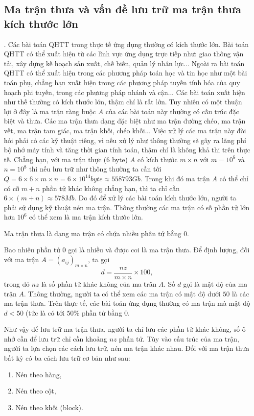 \subsection{Ma trận thưa và vấn đề lưu trữ ma trận thưa kích thước lớn}.
Các bài toán QHTT trong thực tế ứng dụng thường có kích thước lớn. Bài toán QHTT có thể xuất hiện từ các lĩnh vực ứng dụng trực tiếp như: giao thông vận tải, xây dựng kế hoạch sản xuất, chế biến, quản lý nhân lực... Ngoài ra bài toán QHTT có thể xuất hiện trong các phương pháp toán học và tin học như một bài toán phụ, chẳng hạn xuất hiện trong các phương pháp tuyến tính hóa của quy hoạch phi tuyến, trong các phương pháp nhánh và cận... Các bài toán xuất hiện như thế thường có kích thước lớn, thậm chí là rất lớn. Tuy nhiên có một thuận lợi ở đây là ma trận ràng buộc $A$ của các bài toán này thường có cấu trúc đặc biệt và thưa. Các ma trận thưa dạng đặc biệt như ma trận đường chéo, ma trận vết, ma trận tam giác, ma trận khối, chéo khối... Việc xử lý các ma trận này đòi hỏi phải có các kỹ thuật riêng, vì nếu xử lý như thông thường sẽ gây ra lãng phí bộ nhớ máy tính và tăng thời gian tính toán, thậm chí là không khả thi trên thực tế. Chẳng hạn, với ma trận thực ($6$ byte) $A$ có kích thước $m\times n$ với $m=10^6$ và $n=10^8$ thì nếu lưu trữ như thông thường ta cần tới $Q=6\times 6\times m\times n=6\times 10^{14}byte \approx 558793 Gb$. Trong khi đó ma trận $A$ có thể chỉ có cỡ $m+n$ phần tử khác không chẳng hạn, thì ta chỉ cần $6\times (m+n) \approx 578 Mb$. Do đó để xử lý các bài toán kích thước lớn, người ta phải sử dụng kỹ thuật nén ma trận. Thông thường các ma trận có số phần tử lớn hơn $10^6$ có thể xem là ma trận kích thước lớn.

\begin{definition}
Ma trận thưa là dạng ma trận có chứa nhiều phần tử bằng 0.
\end{definition}
Bao nhiêu phần tử $0$ gọi là nhiều và được coi là ma trận thưa. Để định lượng, đối với ma trận $A=(a_{ij})_{m\times n}$, ta gọi
$$
d = \dfrac{nz}{m\times n}\times 100,
$$
trong đó $nz$ là số phần tử khác không của ma trân $A$. Số $d$ gọi là mật độ của ma trận $A$. Thông thường, người ta có thể xem các ma trận có mật độ dưới $50$ là các ma trận thưa. Trên thực tế, các bài toán ứng dụng thường có ma trận mà mật độ $d<50$ (tức là có tới $50 \% $ phần tử bằng $0$. 

Như vậy để lưu trữ ma trận thưa, người ta chỉ lưu các phần tử khác không, số ô nhớ cần để lưu trữ chỉ cần khoảng $nz$ phần tử. Tùy vào cấu trúc của ma trận, người ta lựa chọn các cách lưu trữ, nén ma trận khác nhau. Đối với ma trận thưa bất kỳ có ba cách lưu trữ cơ bản như sau: 
\begin{enumerate}
\item Nén theo hàng,
\item Nén theo cột,
\item Nén theo khối (block).
\end{enumerate}

